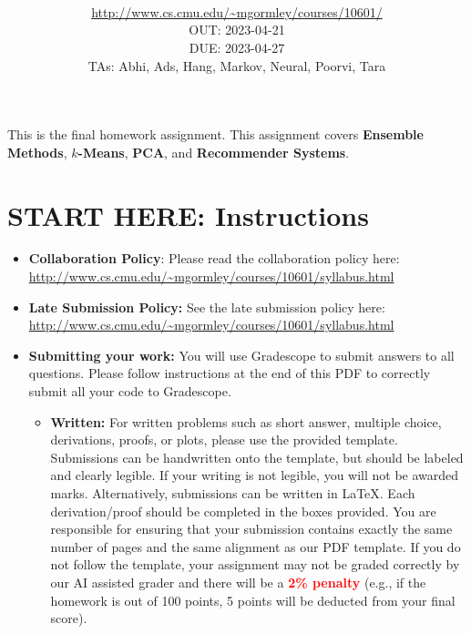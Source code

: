 \documentclass[11pt,addpoints,answers]{exam}
\title{\textsc{\hwName}
} %
\author{\courseName\\
\url{http://www.cs.cmu.edu/~mgormley/courses/10601/} \\
OUT:  2023-04-21 \\
DUE:  2023-04-27 \\ 
TAs: Abhi, Ads, Hang, Markov, Neural, Poorvi, Tara
}
\date{}
\date{}
\newcommand{\homeworktype}{\string written}
\begin{document}
\maketitle

\begin{notebox}
This is the final homework assignment. This assignment covers \textbf{Ensemble Methods}, \textbf{$k$-Means}, \textbf{PCA}, and \textbf{Recommender Systems}.
\end{notebox}
\newcommand \maxsubs {10 }
\section*{START HERE: Instructions}
\begin{itemize}

\item \textbf{Collaboration Policy}: Please read the collaboration policy here: \url{http://www.cs.cmu.edu/~mgormley/courses/10601/syllabus.html}

\item\textbf{Late Submission Policy:} See the late submission policy here: \url{http://www.cs.cmu.edu/~mgormley/courses/10601/syllabus.html}

\item\textbf{Submitting your work:} You will use Gradescope to submit
  answers to all questions\ifthenelse{\equal{\homeworktype}{\string written}}{}{ and code}. Please
  follow instructions at the end of this PDF to correctly submit all your code to Gradescope.

\begin{itemize}
    
    \item \textbf{Written:} For written problems such as short answer, multiple choice, derivations, proofs, or plots, please use the provided template. Submissions can be handwritten onto the template, but should be labeled and clearly legible. If your writing is not legible, you will not be awarded marks. Alternatively, submissions can be written in \LaTeX{}. Each derivation/proof should be completed in the boxes provided. You are responsible for ensuring that your submission contains exactly the same number of pages and the same alignment as our PDF template. If you do not follow the template, your assignment may not be graded correctly by our AI assisted grader and there will be a \textbf{\textcolor{red}{2\% penalty}} (e.g., if the homework is out of 100 points, 5 points will be deducted from your final score).


\end{itemize}
\end{itemize}
\end{document}
